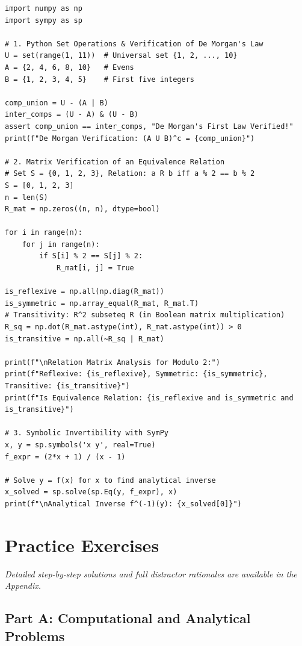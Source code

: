\begin{lstlisting}[caption={Testing Set Laws, Relation Matrices, and Mappings in Python}]
import numpy as np
import sympy as sp

# 1. Python Set Operations & Verification of De Morgan's Law
U = set(range(1, 11))  # Universal set {1, 2, ..., 10}
A = {2, 4, 6, 8, 10}   # Evens
B = {1, 2, 3, 4, 5}    # First five integers

comp_union = U - (A | B)
inter_comps = (U - A) & (U - B)
assert comp_union == inter_comps, "De Morgan's First Law Verified!"
print(f"De Morgan Verification: (A U B)^c = {comp_union}")

# 2. Matrix Verification of an Equivalence Relation
# Set S = {0, 1, 2, 3}, Relation: a R b iff a % 2 == b % 2
S = [0, 1, 2, 3]
n = len(S)
R_mat = np.zeros((n, n), dtype=bool)

for i in range(n):
    for j in range(n):
        if S[i] % 2 == S[j] % 2:
            R_mat[i, j] = True

is_reflexive = np.all(np.diag(R_mat))
is_symmetric = np.array_equal(R_mat, R_mat.T)
# Transitivity: R^2 subseteq R (in Boolean matrix multiplication)
R_sq = np.dot(R_mat.astype(int), R_mat.astype(int)) > 0
is_transitive = np.all(~R_sq | R_mat)

print(f"\nRelation Matrix Analysis for Modulo 2:")
print(f"Reflexive: {is_reflexive}, Symmetric: {is_symmetric}, Transitive: {is_transitive}")
print(f"Is Equivalence Relation: {is_reflexive and is_symmetric and is_transitive}")

# 3. Symbolic Invertibility with SymPy
x, y = sp.symbols('x y', real=True)
f_expr = (2*x + 1) / (x - 1)

# Solve y = f(x) for x to find analytical inverse
x_solved = sp.solve(sp.Eq(y, f_expr), x)
print(f"\nAnalytical Inverse f^(-1)(y): {x_solved[0]}")
\end{lstlisting}

\newpage
\section{Practice Exercises}
\textit{Detailed step-by-step solutions and full distractor rationales are available in the Appendix.}

\subsection*{Part A: Computational and Analytical Problems}

